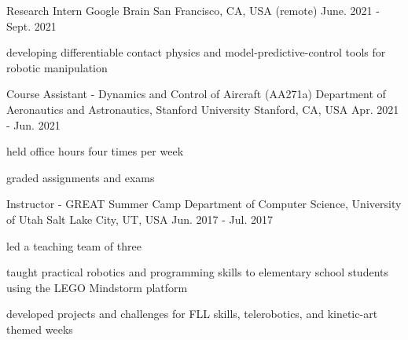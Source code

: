 

\begin{cventries}
	
\cventry
{Research Intern} %
{Google Brain} %
{San Francisco, CA, USA (remote)} %
{June. 2021 - Sept. 2021} %
{
	\begin{cvitems} %
		\item{developing differentiable contact physics and model-predictive-control tools for robotic manipulation}
	\end{cvitems}
}
	
\cventry
{Course Assistant - Dynamics and Control of Aircraft (AA271a)} %
{Department of Aeronautics and Astronautics, Stanford University} %
{Stanford, CA, USA} %
{Apr. 2021 - Jun. 2021} %
{
	\begin{cvitems} %
		\item{held office hours four times per week}
		\item{graded assignments and exams}
	\end{cvitems}
}

  \cventry
    {Instructor - GREAT Summer Camp} %
    {Department of Computer Science, University of Utah} %
    {Salt Lake City, UT, USA} %
    {Jun. 2017 - Jul. 2017} %
    {
      \begin{cvitems} %
        \item {led a teaching team of three}
        \item{taught practical robotics and programming skills to elementary school students using the LEGO Mindstorm platform}
        \item {developed projects and challenges for FLL skills, telerobotics, and kinetic-art themed weeks}
      \end{cvitems}
    }


\end{cventries}
